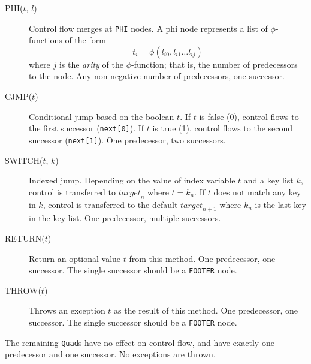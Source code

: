 \documentclass[11pt,notitlepage,twocolumn,twoside]{article}
\newcommand{\phifunction}{$\phi$-function}
\begin{document}
\begin{description}
%
\item[PHI($t$, $l$)] Control flow merges at \texttt{PHI} nodes.
A phi node represents a list of \phifunction{s} of the form
\[ t_i = \phi(l_{i0}, l_{i1} \ldots l_{ij}) \]
where $j$ is the \textit{arity} of the \phifunction; that is, 
the number of predecessors to the node.  Any non-negative number of
predecessors, one successor.
%
\item[CJMP($t$)] Conditional jump based on the boolean $t$.  If $t$ is
false (0), control flows to the first successor (\texttt{next[0]}).
If $t$ is true (1), control flows to the second successor
(\texttt{next[1]}).  One predecessor, two successors.
%
\item[SWITCH($t$, $k$)] Indexed jump.  Depending on the value of index
variable $t$ and a key list $k$, control is transferred to 
${target}_n$ where $t = k_n$.  If $t$ does not match any key in $k$,
control is transferred to the default ${target}_{n+1}$ where $k_n$ is
the last key in the key list.  One predecessor, multiple successors.
%
\item[RETURN($t$)] Return an optional value $t$ from this method.
One predecessor, one successor.  The single successor should be a
\texttt{FOOTER} node.
%
\item[THROW($t$)] Throws an exception $t$ as the result of this method.
One predecessor, one successor.  The single successor should be a
\texttt{FOOTER} node.
\end{description}
%
The remaining \texttt{Quad}s have no effect on control flow, and have
exactly one predecessor and one successor.  No exceptions are thrown.
\end{document}
